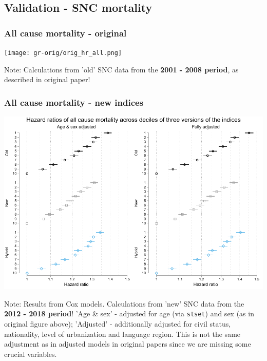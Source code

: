 \documentclass[a4paper, notitlepage, fleqn]{article} %
\begin{document}
\subsection{Validation - SNC mortality}

\subsubsection{All cause mortality - original}

\begin{center}
\texttt{[image: gr-orig/orig\_hr\_all.png]} 
\end{center}

Note: 	Calculations from 'old' SNC data from the \textbf{2001 - 2008 period}, as described in original paper!

\subsubsection{All cause mortality - new indices}
\begin{center}
\includegraphics[width=\textwidth]{gr/sep3.pdf}
\end{center}

Note: 	Results from Cox models. Calculations from 'new' SNC data from the \textbf{2012 - 2018 period}!  
		'Age \& sex' - adjusted for age (via \texttt{stset}) and sex (as in original figure above);  
		'Adjusted' - additionally adjusted for civil status, nationality, level of urbanization and language region.  
		This is not the same adjustment as in adjusted models in original papers since we are missing some crucial variables. 
\newpage
\end{document}
